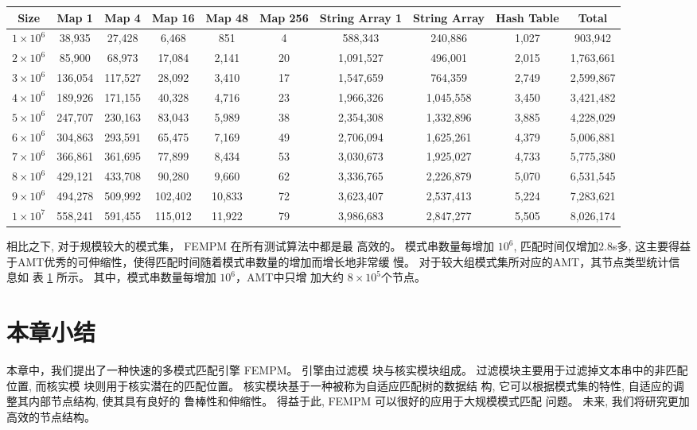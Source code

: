 \begin{table}[!htp]
  \centering
  \footnotesize
  \label{tab:large_group}
  \begin{tabular}{cccccccccc}
 \hline
 Size &
 Map 1 &
 Map 4 &
 Map 16 &
 Map 48 &
 Map 256 &
 String Array 1&
 String Array   &
 Hash Table &
 Total\\
\hline
$1 \times 10^6$ &  38,935 &   27,428  &   6,468 &     851   &    4 &    588,343  &    240,886 &  1,027 &    903,942  \\
$2 \times 10^6$ &  85,900 &   68,973  &  17,084 &   2,141   &   20 &  1,091,527  &    496,001 &  2,015 &  1,763,661  \\
$3 \times 10^6$ & 136,054 &  117,527  &  28,092 &   3,410   &   17 &  1,547,659  &    764,359 &  2,749 &  2,599,867  \\
$4 \times 10^6$ & 189,926 &  171,155  &  40,328 &   4,716   &   23 &  1,966,326  &  1,045,558 &  3,450 &  3,421,482  \\
$5 \times 10^6$ & 247,707 &  230,163  &  83,043 &   5,989   &  38 &  2,354,308   &  1,332,896 &  3,885 &  4,228,029  \\
$6 \times 10^6$ & 304,863 &  293,591  &  65,475 &   7,169   &   49 &  2,706,094  &  1,625,261 &  4,379 &  5,006,881  \\
$7 \times 10^6$ & 366,861 &  361,695  &  77,899 &   8,434   &   53 &  3,030,673  &  1,925,027 &  4,733 &  5,775,380  \\
$8 \times 10^6$ & 429,121 &  433,708  &  90,280 &   9,660   &   62 &  3,336,765  &  2,226,879 &  5,070 &  6,531,545  \\
$9 \times 10^6$ & 494,278 &  509,992  & 102,402 &  10,833   &   72 &  3,623,407  &  2,537,413 &  5,224 &  7,283,621  \\
$1 \times 10^7$ & 558,241 &  591,455  & 115,012 &  11,922   &   79 &  3,986,683  &  2,847,277 &  5,505 &  8,026,174  \\
\hline
\end{tabular}
\end{table}

相比之下, 对于规模较大的模式集， \textsf{FEMPM} 在所有测试算法中都是最
高效的。 模式串数量每增加 $10^6$, 匹配时间仅增加2.8s多, 这主要得益
于AMT优秀的可伸缩性，使得匹配时间随着模式串数量的增加而增长地非常缓
慢。 对于较大组模式集所对应的AMT，其节点类型统计信息如
表 \ref{tab:large_group} 所示。 其中，模式串数量每增加 $10^6$，AMT中只增
加大约 $8 \times 10^5$个节点。

\section{本章小结}
\label{sec:2_conclusion}

本章中，我们提出了一种快速的多模式匹配引擎 \textsf{FEMPM}。 引擎由过滤模
块与核实模块组成。 过滤模块主要用于过滤掉文本串中的非匹配位置, 而核实模
块则用于核实潜在的匹配位置。 核实模块基于一种被称为自适应匹配树的数据结
构, 它可以根据模式集的特性, 自适应的调整其内部节点结构, 使其具有良好的
鲁棒性和伸缩性。 得益于此, \textsf{FEMPM} 可以很好的应用于大规模模式匹配
问题。 未来, 我们将研究更加高效的节点结构。
